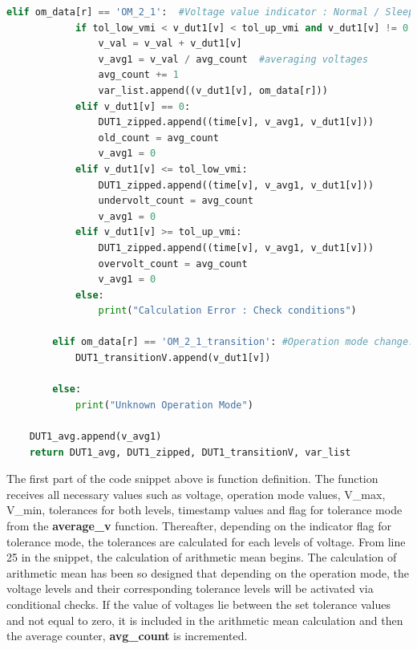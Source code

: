 \begin{lstlisting}[language = Python]
        elif om_data[r] == 'OM_2_1':  #Voltage value indicator : Normal / Sleep mode
            if tol_low_vmi < v_dut1[v] < tol_up_vmi and v_dut1[v] != 0:
                v_val = v_val + v_dut1[v]
                v_avg1 = v_val / avg_count  #averaging voltages
                avg_count += 1
                var_list.append((v_dut1[v], om_data[r]))
            elif v_dut1[v] == 0:
                DUT1_zipped.append((time[v], v_avg1, v_dut1[v]))
                old_count = avg_count
                v_avg1 = 0
            elif v_dut1[v] <= tol_low_vmi:
                DUT1_zipped.append((time[v], v_avg1, v_dut1[v]))
                undervolt_count = avg_count
                v_avg1 = 0
            elif v_dut1[v] >= tol_up_vmi:
                DUT1_zipped.append((time[v], v_avg1, v_dut1[v]))
                overvolt_count = avg_count
                v_avg1 = 0
            else:
                print("Calculation Error : Check conditions")
 
        elif om_data[r] == 'OM_2_1_transition': #Operation mode change. No averaging here
            DUT1_transitionV.append(v_dut1[v])
 
        else:
            print("Unknown Operation Mode")
 
    DUT1_avg.append(v_avg1)
    return DUT1_avg, DUT1_zipped, DUT1_transitionV, var_list
\end{lstlisting}

The first part of the code snippet above is function definition. The function receives all necessary values such as voltage, operation mode values, V\_max, V\_min, tolerances for both levels, timestamp values and flag for tolerance mode from the \textbf{average\_v} function. Thereafter, depending on the indicator flag for tolerance mode, the tolerances are calculated for each levels of voltage. From line 25 in the snippet, the calculation of arithmetic mean begins. The calculation of arithmetic mean has been so designed that depending on the operation mode, the voltage levels and their corresponding tolerance levels will be activated via conditional checks. If the value of voltages lie between the set tolerance values and not equal to zero, it is included in the arithmetic mean calculation and then the average counter, \textbf{avg\_count} is incremented. 

